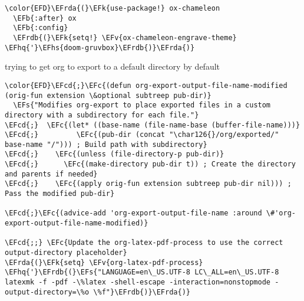 \documentclass{article}
\newcommand{\EFc}[1]{\textcolor{EFc}{#1}} %
\newcommand{\EFcd}[1]{\textcolor{EFcd}{#1}} %
\newcommand{\EFs}[1]{\textcolor{EFs}{#1}} %
\newcommand{\EFk}[1]{\textcolor{EFk}{#1}} %
\newcommand{\EFb}[1]{\textcolor{EFb}{#1}} %
\newcommand{\EFv}[1]{\textcolor{EFv}{#1}} %
\newcommand{\EFhq}[1]{#1} %
\newcommand{\EFhs}[1]{\textcolor{EFhs}{#1}} %
\newcommand{\EFrda}[1]{\textcolor{EFrda}{#1}} %
\newcommand{\EFrdb}[1]{\textcolor{EFrdb}{#1}} %
\begin{document}
\begin{Code}
\begin{Verbatim}
\color{EFD}\EFrda{(}\EFk{use-package!} ox-chameleon
  \EFb{:after} ox
  \EFb{:config}
  \EFrdb{(}\EFk{setq!} \EFv{ox-chameleon-engrave-theme} \EFhq{'}\EFhs{doom-gruvbox}\EFrdb{)}\EFrda{)}
\end{Verbatim}
\end{Code}

trying to get org to export to a default directory by default
\begin{Code}
\begin{Verbatim}
\color{EFD}\EFcd{;}\EFc{(defun org-export-output-file-name-modified (orig-fun extension \&optional subtreep pub-dir)}
  \EFs{"Modifies org-export to place exported files in a custom directory with a subdirectory for each file."}
\EFcd{;}  \EFc{(let* ((base-name (file-name-base (buffer-file-name)))}
\EFcd{;}         \EFc{(pub-dir (concat "\char126{}/org/exported/" base-name "/"))) ; Build path with subdirectory}
\EFcd{;}    \EFc{(unless (file-directory-p pub-dir)}
\EFcd{;}      \EFc{(make-directory pub-dir t)) ; Create the directory and parents if needed}
\EFcd{;}    \EFc{(apply orig-fun extension subtreep pub-dir nil))) ; Pass the modified pub-dir}

\EFcd{;}\EFc{(advice-add 'org-export-output-file-name :around \#'org-export-output-file-name-modified)}

\EFcd{;;} \EFc{Update the org-latex-pdf-process to use the correct output-directory placeholder}
\EFrda{(}\EFk{setq} \EFv{org-latex-pdf-process} \EFhq{'}\EFrdb{(}\EFs{"LANGUAGE=en\_US.UTF-8 LC\_ALL=en\_US.UTF-8 latexmk -f -pdf -\%latex -shell-escape -interaction=nonstopmode -output-directory=\%o \%f"}\EFrdb{)}\EFrda{)}
\end{Verbatim}
\end{Code}
\end{document}
